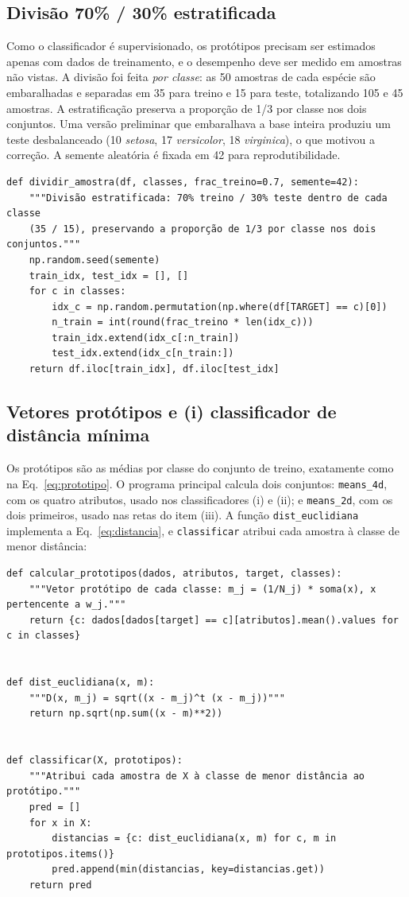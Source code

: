 \documentclass[12pt,a4paper]{article}
\begin{document}
\subsection{Divisão 70\% / 30\% estratificada}

Como o classificador é supervisionado, os protótipos precisam ser estimados apenas com dados de treinamento, e o desempenho deve ser medido em amostras não vistas. A divisão foi feita \emph{por classe}: as 50 amostras de cada espécie são embaralhadas e separadas em 35 para treino e 15 para teste, totalizando 105 e 45 amostras. A estratificação preserva a proporção de 1/3 por classe nos dois conjuntos. Uma versão preliminar que embaralhava a base inteira produziu um teste desbalanceado (10 \emph{setosa}, 17 \emph{versicolor}, 18 \emph{virginica}), o que motivou a correção. A semente aleatória é fixada em 42 para reprodutibilidade.

\begin{lstlisting}[firstnumber=15,title=\texttt{main.py}]
def dividir_amostra(df, classes, frac_treino=0.7, semente=42):
    """Divisão estratificada: 70% treino / 30% teste dentro de cada classe
    (35 / 15), preservando a proporção de 1/3 por classe nos dois conjuntos."""
    np.random.seed(semente)
    train_idx, test_idx = [], []
    for c in classes:
        idx_c = np.random.permutation(np.where(df[TARGET] == c)[0])
        n_train = int(round(frac_treino * len(idx_c)))
        train_idx.extend(idx_c[:n_train])
        test_idx.extend(idx_c[n_train:])
    return df.iloc[train_idx], df.iloc[test_idx]
\end{lstlisting}

\subsection{Vetores protótipos e (i) classificador de distância mínima}

Os protótipos são as médias por classe do conjunto de treino, exatamente como na Eq.~\eqref{eq:prototipo}. O programa principal calcula dois conjuntos: \texttt{means\_4d}, com os quatro atributos, usado nos classificadores (i) e (ii); e \texttt{means\_2d}, com os dois primeiros, usado nas retas do item (iii). A função \texttt{dist\_euclidiana} implementa a Eq.~\eqref{eq:distancia}, e \texttt{classificar} atribui cada amostra à classe de menor distância:

\begin{lstlisting}[firstnumber=9,title=\texttt{distancia\_minima.py}]
def calcular_prototipos(dados, atributos, target, classes):
    """Vetor protótipo de cada classe: m_j = (1/N_j) * soma(x), x pertencente a w_j."""
    return {c: dados[dados[target] == c][atributos].mean().values for c in classes}


def dist_euclidiana(x, m):
    """D(x, m_j) = sqrt((x - m_j)^t (x - m_j))"""
    return np.sqrt(np.sum((x - m)**2))


def classificar(X, prototipos):
    """Atribui cada amostra de X à classe de menor distância ao protótipo."""
    pred = []
    for x in X:
        distancias = {c: dist_euclidiana(x, m) for c, m in prototipos.items()}
        pred.append(min(distancias, key=distancias.get))
    return pred
\end{lstlisting}
\end{document}
